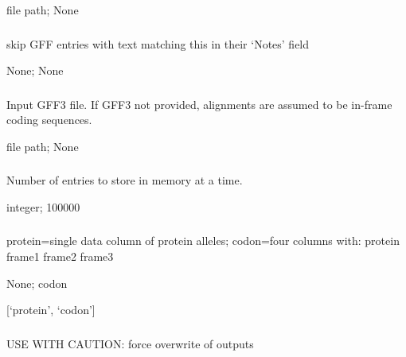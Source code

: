 \documentclass[letterpaper,11pt,english]{sphinxmanual}
\begin{document}
 file path;  None


\subsubsection{}
\label{\detokenize{prog_desc:id142}}
 skip GFF entries with text matching this in their ‘Notes’ field

 None;  None


\subsubsection{}
\label{\detokenize{prog_desc:id143}}
 Input GFF3 file. If GFF3 not provided, alignments are assumed to be in-frame coding sequences.

 file path;  None


\subsubsection{}
\label{\detokenize{prog_desc:id144}}
 Number of entries to store in memory at a time.

 integer;  100000


\subsubsection{}
\label{\detokenize{prog_desc:id145}}
 protein=single data column of protein alleles; codon=four columns with: protein frame1 frame2 frame3

 None;  codon

 {[}‘protein’, ‘codon’{]}


\subsubsection{}
\label{\detokenize{prog_desc:id146}}
 USE WITH CAUTION: force overwrite of outputs
\end{document}
